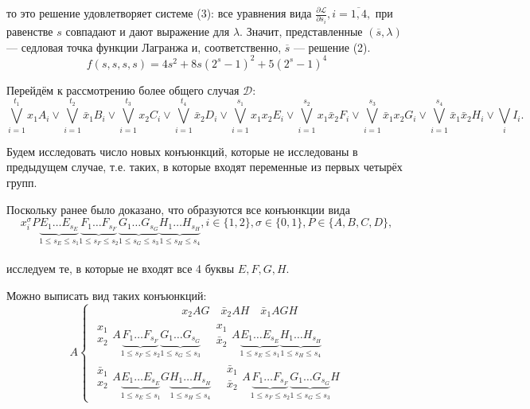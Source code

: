 \documentclass[12pt,a4paper,oneside,fleqn,leqno]{article}
\theoremstyle{definition}
\begin{document}
			то это решение удовлетворяет системе (3): все уравнения вида $\frac{\partial\mathcal{L}}{\partial s_i},i=\overline{1,4},$ при равенстве $s$ совпадают и дают выражение для $\lambda$. Значит, представленные $(\overline{s}, \lambda)$ --- седловая точка функции Лагранжа и, соответственно, $\overline{s}$ --- решение (2).
			$$
				f(s,s,s,s) = 4s^2 + 8s(2^s - 1)^2 + 5(2^s - 1)^4
			$$\par
			Перейдём к рассмотрению более общего случая $\mathcal{D}:$
			$$
				\bigvee_{i = 1}^{t_1}x_1A_i \vee \bigvee_{i = 1}^{t_2}\bar{x}_1B_i \vee \bigvee_{i = 1}^{t_3}x_2C_i \vee \bigvee_{i = 1}^{t_4}\bar{x}_2D_i \vee \bigvee_{i = 1}^{s_1}x_1x_2E_i \vee \bigvee_{i = 1}^{s_2}x_1\bar{x}_2F_i \vee \bigvee_{i = 1}^{s_3}\bar{x}_1x_2G_i \vee \bigvee_{i = 1}^{s_4}\bar{x}_1\bar{x}_2H_i \vee \bigvee_iI_i.
			$$\par
			Будем исследовать число новых конъюнкций, которые не исследованы в предыдущем случае, т.е. таких, в которые входят переменные из первых четырёх групп.\par
			Поскольку ранее было доказано, что образуются все конъюнкции вида
			$$%
				x_i^{\sigma} P \underbrace{E_1\ldots E_{s_E}}_{1\leqslant s_E \leqslant s_1}\underbrace{F_1\ldots F_{s_F}}_{1\leqslant s_F \leqslant s_2}\underbrace{G_1\ldots G_{s_G}}_{1\leqslant s_G \leqslant s_3}\underbrace{H_1\ldots H_{s_H}}_{1\leqslant s_H \leqslant s_4}, i\in\{1,2\},\sigma\in\{0,1\}, P \in \{A, B, C, D\},
			$$\\%
			исследуем те, в которые не входят все 4 буквы $E, F, G, H.$\par
			Можно выписать вид таких конъюнкций:
			$$
			A\begin{cases}
\qquad\qquad\qquad\qquad x_2AG\quad \bar{x}_2AH\quad \bar{x}_1AGH\\
\begin{matrix}x_1\\x_2\end{matrix} A\underbrace{F_1\ldots F_{s_F}}_{1 \leqslant s_F \leqslant s_2}\underbrace{G_1\ldots G_{s_G}}_{1 \leqslant s_G \leqslant s_3} \quad
 \begin{matrix}x_1\\\bar{x}_2\end{matrix} A\underbrace{E_1\ldots E_{s_E}}_{1 \leqslant s_E \leqslant s_1}\underbrace{H_1\ldots H_{s_H}}_{1 \leqslant s_H \leqslant s_4} \\
 \begin{matrix}\bar{x}_1\\x_2\end{matrix} A\underbrace{E_1\ldots E_{s_E}}_{1 \leqslant s_E \leqslant s_1}G\underbrace{H_1\ldots H_{s_H}}_{1 \leqslant s_H \leqslant s_4} \quad
\begin{matrix}\bar{x}_1\\\bar{x}_2\end{matrix} A\underbrace{F_1\ldots F_{s_F}}_{1 \leqslant s_F \leqslant s_2}\underbrace{G_1\ldots G_{s_G}}_{1 \leqslant s_G \leqslant s_3}H
			\end{cases}
			$$
\end{document}
